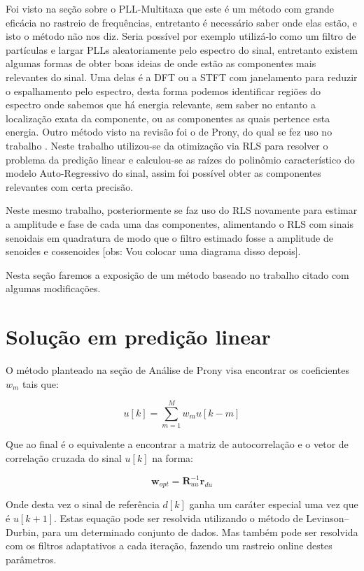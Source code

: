 Foi visto na seção sobre o PLL-Multitaxa que este é um método com grande eficácia no rastreio de frequências, entretanto é necessário saber onde elas estão, e isto o método não nos diz. Seria possível por exemplo utilizá-lo como um filtro de partículas e largar PLLs aleatoriamente pelo espectro do sinal, entretanto existem algumas formas de obter boas ideias de onde estão as componentes mais relevantes do sinal. Uma delas é a DFT ou a STFT com janelamento para reduzir o espalhamento pelo espectro, desta forma podemos identificar regiões do espectro onde sabemos que há energia relevante, sem saber no entanto a localização exata da componente, ou as componentes as quais pertence esta energia. Outro método visto na revisão foi o de Prony, do qual se fez uso no trabalho \cite{chang2009two}. Neste trabalho utilizou-se da otimização via RLS para resolver o problema da predição linear e calculou-se as raízes do polinômio característico do modelo Auto-Regressivo do sinal, assim foi possível obter as componentes relevantes com certa precisão.

\indent Neste mesmo trabalho, posteriormente se faz uso do RLS novamente para estimar a amplitude e fase de cada uma das componentes, alimentando o RLS com sinais senoidais em quadratura de modo que o filtro estimado fosse a amplitude de senoides e cossenoides [obs: Vou colocar uma diagrama disso depois]. 

\indent Nesta seção faremos a exposição de um método baseado no trabalho citado com algumas modificações.

\section{Solução em predição linear}

O método planteado na seção de Análise de Prony visa encontrar os coeficientes $w_m$ tais que:

\begin{equation}
u[k]=\sum_{m=1}^{M}w_m u[k-m]
\end{equation}

Que ao final é o equivalente a encontrar a matriz de autocorrelação e o vetor de correlação cruzada do sinal $u[k]$ na forma:

\begin{equation}
\boldsymbol{w}_{opt}=\boldsymbol{R}_{uu}^{-1}\boldsymbol{r}_{du}
\end{equation}

Onde desta vez o sinal de referência $d[k]$ ganha um caráter especial uma vez que é $u[k+1]$. Estas equação pode ser resolvida utilizando o método de Levinson–Durbin, para um determinado conjunto de dados. Mas também pode ser resolvida com os filtros adaptativos a cada iteração, fazendo um rastreio online destes parâmetros.

